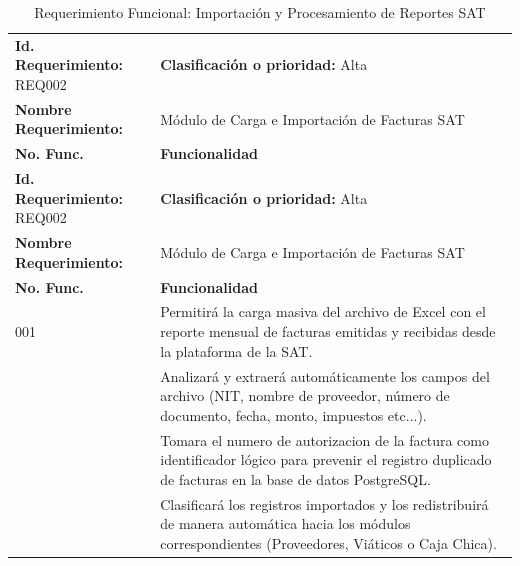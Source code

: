 {
\small
{}
\setlength{\parindent}{0pt}
\begin{xltabular}{\linewidth}{
    >{\raggedright\arraybackslash}p{4.2cm} 
    >{\raggedright\arraybackslash}X
}

    \caption{Requerimiento Funcional: Importación y Procesamiento de Reportes SAT} \label{tab:req002_sat} \\
    \toprule
    \textbf{Id. Requerimiento:} REQ002 & \textbf{Clasificación o prioridad:} Alta \\
    \textbf{Nombre Requerimiento:} & Módulo de Carga e Importación de Facturas SAT \\
    \textbf{No. Func.} & \textbf{Funcionalidad} \\
    \midrule
    \endfirsthead

    \toprule
    \textbf{Id. Requerimiento:} REQ002 & \textbf{Clasificación o prioridad:} Alta \\
    \textbf{Nombre Requerimiento:} & Módulo de Carga e Importación de Facturas SAT \\
    \textbf{No. Func.} & \textbf{Funcionalidad} \\
    \midrule
    \endhead

    \endfoot

    \bottomrule
\endlastfoot

    001 & Permitirá la carga masiva del archivo de Excel con el reporte mensual de facturas emitidas y recibidas desde la plataforma de la SAT. \\
     & Analizará y extraerá automáticamente los campos del archivo (NIT, nombre de proveedor, número de documento, fecha, monto, impuestos etc...). \\
     & Tomara el numero de autorizacion de la factura como identificador lógico para prevenir el registro duplicado de facturas en la base de datos PostgreSQL. \\
     & Clasificará los registros importados y los redistribuirá de manera automática hacia los módulos correspondientes (Proveedores, Viáticos o Caja Chica). \\
\end{xltabular}
}

